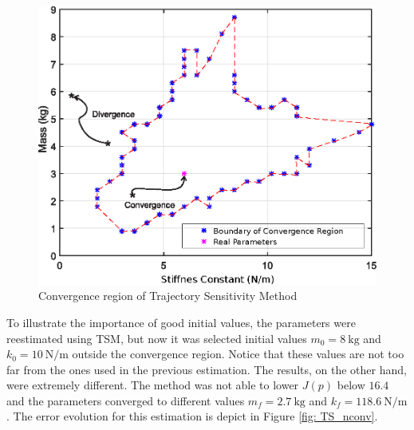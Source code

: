 \begin{figure}[h]
	\caption{Convergence region of Trajectory Sensitivity Method}
	\begin{center}
		\includegraphics[scale=0.6]{Images/Conv_reg.eps}
	\end{center}
	\label{fig: conv_reg}
\end{figure}

To illustrate the importance of good initial values, the parameters were reestimated using TSM, but now it was selected initial values $m_{0} = 8\ \text{kg}$ and $k_{0} = 10\ \text{N/m}$ outside the convergence region. Notice that these values are not too far from the ones used in the previous estimation. The results, on the other hand, were extremely different. The method was not able to lower $J(p)$ below $16.4$ and the parameters converged to different values $m_{f} = 2.7\ \text{kg}$ and $k_{f} = 118.6\ \text{N/m}$. The error evolution for this estimation is depict in Figure \ref{fig: TS_nconv}.

